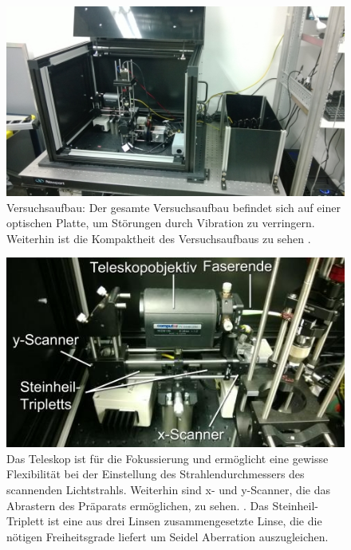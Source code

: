 \begin{figure}[H]
	\centering
\includegraphics[width=1.0\linewidth]{IMAGE/versuchsaufbau.png}
	\caption{Versuchsaufbau: Der gesamte Versuchsaufbau befindet sich auf einer optischen Platte, um Störungen durch Vibration zu verringern. Weiterhin ist die Kompaktheit des Versuchsaufbaus zu sehen \cite{Anleitung}.}
	\label{fig:versuchsaufbau}
\end{figure} 

\begin{figure}[H]
	\centering
\includegraphics[width=1.0\linewidth]{IMAGE/scanner.jpeg}
	\caption{Das Teleskop ist für die Fokussierung und ermöglicht eine gewisse Flexibilität bei der Einstellung des Strahlendurchmessers des scannenden Lichtstrahls. Weiterhin sind x- und y-Scanner, die das Abrastern des Präparats ermöglichen, zu sehen. \cite{Anleitung}. Das Steinheil-Triplett ist eine aus drei Linsen zusammengesetzte Linse, die die nötigen Freiheitsgrade liefert um Seidel Aberration auszugleichen.
	}
	\label{fig:scanner}
\end{figure}

